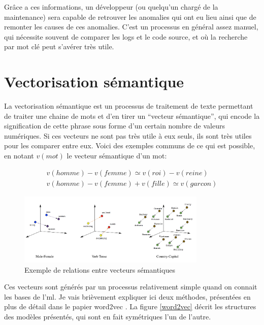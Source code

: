 \documentclass[openany, 11pt]{memoir}
\begin{document}
Grâce a ces informations, un développeur (ou quelqu'un chargé de la maintenance) sera capable de retrouver les anomalies qui ont eu lieu ainsi que de remonter les causes de ces anomalies. C'est un processus en général assez manuel, qui nécessite souvent de comparer les logs et le code source, et où la recherche par mot clé peut s'avérer très utile.


\section{Vectorisation sémantique}
\label{vectorisationsemantique}

La vectorisation sémantique est un processus de traitement de texte permettant de traiter une chaine de mots et d'en tirer un ``vecteur sémantique'', qui encode la signification de cette phrase sous forme d'un certain nombre de valeurs numériques. Si ces vecteurs ne sont pas très utile à eux seuls, ils sont très utiles pour les comparer entre eux. Voici des exemples communs de ce qui est possible, en notant $v(mot)$ le vecteur sémantique d'un mot:

\begin{equation}
\begin{split}
	v(homme) - v(femme) \simeq v(roi) - v(reine)\\
	v(homme) - v(femme) + v(fille) \simeq v(garcon)
\end{split}
\end{equation}

\begin{figure}[ht]
	\centering
	\includegraphics[width=0.8\textwidth]{images/wordvec.png}
	\caption{Exemple de relations entre vecteurs sémantiques}
	\label{wordvec}
\end{figure}

Ces vecteurs sont générés par un processus relativement simple quand on connait les bases de l'\gls{ml}. Je vais brièvement expliquer ici deux méthodes, présentées en plus de détail dans le papier word2vec \cite{word2vec}. La figure \ref{word2vec} décrit les structures des modèles présentés, qui sont en fait symétriques l'un de l'autre.
\end{document}
